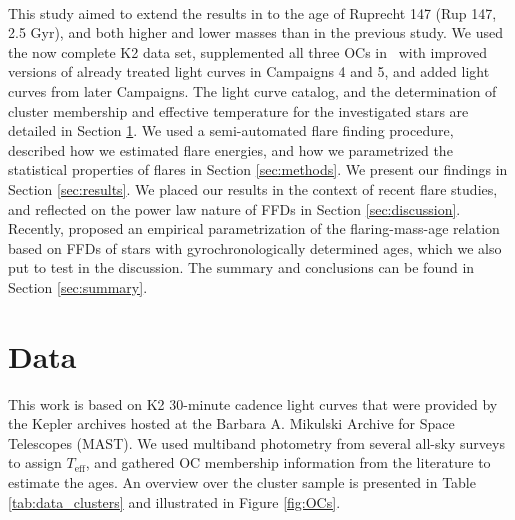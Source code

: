 \documentclass{aa}
\begin{document}
\\
This study aimed to extend the results in  to the age of Ruprecht 147 (Rup 147, 2.5 Gyr), and both higher and lower masses than in the previous study. We used the now complete K2 data set, supplemented all three OCs in~ with improved versions of already treated light curves in Campaigns 4 and 5, and added light curves from later Campaigns. The light curve catalog, and the determination of cluster membership and effective temperature for the investigated stars are detailed in Section \ref{sec:data}. We used a semi-automated flare finding procedure, described how we estimated flare energies, and how we parametrized the statistical properties of flares in Section \ref{sec:methods}. We present our findings in Section \ref{sec:results}. We placed our results in the context of recent flare studies, and reflected on the power law nature of FFDs in Section \ref{sec:discussion}. Recently, \citet{davenport2019} proposed an empirical parametrization of the flaring-mass-age relation based on FFDs of stars with gyrochronologically determined ages, which we also put to test in the discussion. The summary and conclusions can be found in Section \ref{sec:summary}.
\section{Data}
\label{sec:data}
This work is based on K2 30-minute cadence light curves that were provided by the Kepler archives hosted at the Barbara A. Mikulski Archive for Space Telescopes (MAST). We used multiband photometry from several all-sky surveys  to assign $T_\mathrm{eff}$, and gathered OC membership information from the literature to estimate the ages. An overview over the cluster sample is presented in Table \ref{tab:data_clusters} and illustrated in Figure \ref{fig:OCs}.
\end{document}
